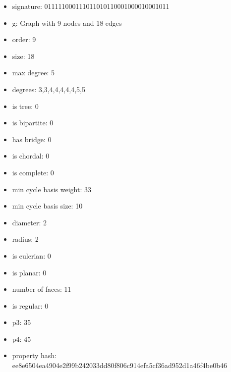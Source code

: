 \newpage
\begin{figure}
\end{figure}
\begin{itemize}
\item signature: 011111000111011010110001000010001011
\item g: Graph with 9 nodes and 18 edges
\item order: 9
\item size: 18
\item max degree: 5
\item degrees: 3,3,4,4,4,4,4,5,5
\item is tree: 0
\item is bipartite: 0
\item has bridge: 0
\item is chordal: 0
\item is complete: 0
\item min cycle basis weight: 33
\item min cycle basis size: 10
\item diameter: 2
\item radius: 2
\item is eulerian: 0
\item is planar: 0
\item number of faces: 11
\item is regular: 0
\item p3: 35
\item p4: 45
\item property hash: ee8e6504ea4904e2f99b242033dd80f806c914efa5cf36ad952d1a46f4be0b46
\end{itemize}
